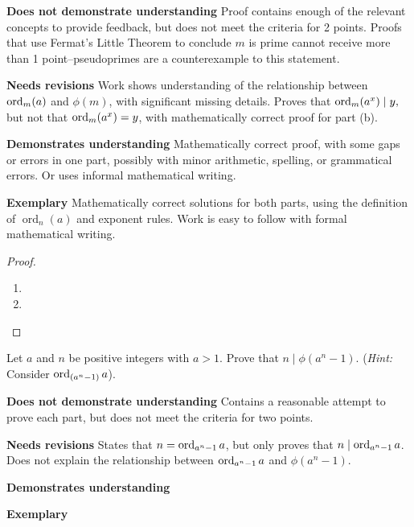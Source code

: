\documentclass[letterpaper, 11pt]{../ximera}
\begin{document}
\begin{writeRubric}
    \item \textbf{Does not demonstrate understanding}
          Proof contains enough of the relevant concepts to provide feedback, but does not meet the criteria for 2 points. Proofs that use Fermat's Little Theorem to conclude $m$ is prime cannot receive more than 1 point--pseudoprimes are a counterexample to this statement.
          
    \item \textbf{Needs revisions}
	Work shows understanding of the relationship between $\operatorname{ord}_m (a)$ and $\phi(m)$, with significant missing details. Proves that $\operatorname{ord}_m(a^x)\mid y,$ but not that $\operatorname{ord}_m(a^x)=y$, with mathematically correct proof for part (b).
 
    \item \textbf{Demonstrates understanding}
    Mathematically correct proof, with some gaps or errors in one part, possibly with minor arithmetic, spelling, or grammatical errors. Or uses informal mathematical writing.
    
    \item \textbf{Exemplary}
    Mathematically correct solutions for both parts, using the definition of $\operatorname{ord}_n(a)$ and exponent rules. Work is easy to follow with formal mathematical writing.
\end{writeRubric}
                                       	
\begin{proof}
 	\begin{enumerate}[label=(\alph*)]
 		\item 
		\item 
	\end{enumerate}
\end{proof}

\begin{ex} 
	Let $a$ and $n$ be positive integers with $a>1$. Prove that $n\mid \phi(a^n-1)$. (\emph{Hint:} Consider $\operatorname{ord}_{(a^n-1)} a$). 
\end{ex}

\begin{writeRubric}
    \item \textbf{Does not demonstrate understanding}
     Contains a reasonable attempt to prove each part, but does not meet the criteria for two points.
    \item \textbf{Needs revisions}
    States that $n=\operatorname{ord}_{a^n-1}a$, but only proves that $n\mid \operatorname{ord}_{a^n-1}a$. Does not explain
 the relationship between $\operatorname{ord}_{a^n-1}a$ and $\phi(a^n-1)$. 

     
    \item \textbf{Demonstrates understanding}
    
    \item \textbf{Exemplary}
        
\end{writeRubric}
                                       
\end{document}
